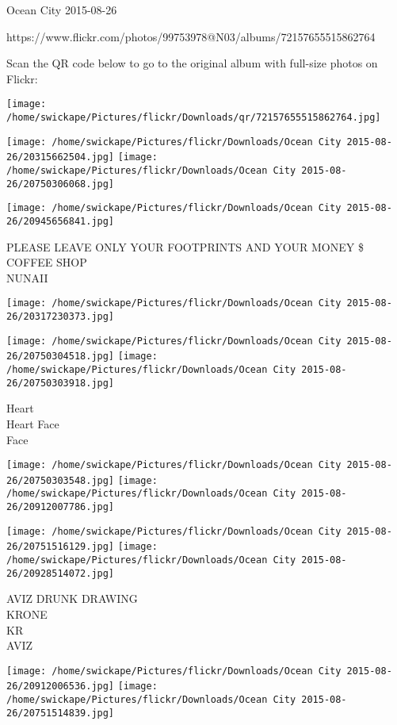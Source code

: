 \documentclass[10pt,letterpaper]{article}
\begin{document}
Ocean City 2015-08-26

https://www.flickr.com/photos/99753978@N03/albums/72157655515862764

Scan the QR code below to go to the original album with full-size photos on Flickr:

\texttt{[image: /home/swickape/Pictures/flickr/Downloads/qr/72157655515862764.jpg]}
\pagebreak

\texttt{[image: /home/swickape/Pictures/flickr/Downloads/Ocean City 2015-08-26/20315662504.jpg]}
\texttt{[image: /home/swickape/Pictures/flickr/Downloads/Ocean City 2015-08-26/20750306068.jpg]}

\texttt{[image: /home/swickape/Pictures/flickr/Downloads/Ocean City 2015-08-26/20945656841.jpg]}

PLEASE LEAVE ONLY YOUR FOOTPRINTS AND YOUR MONEY \$\\
COFFEE SHOP\\
NUNAII
\pagebreak

\texttt{[image: /home/swickape/Pictures/flickr/Downloads/Ocean City 2015-08-26/20317230373.jpg]}

\vspace{0.25in}
\texttt{[image: /home/swickape/Pictures/flickr/Downloads/Ocean City 2015-08-26/20750304518.jpg]}
\texttt{[image: /home/swickape/Pictures/flickr/Downloads/Ocean City 2015-08-26/20750303918.jpg]}

Heart\\
Heart Face\\
Face
\pagebreak

\texttt{[image: /home/swickape/Pictures/flickr/Downloads/Ocean City 2015-08-26/20750303548.jpg]}
\texttt{[image: /home/swickape/Pictures/flickr/Downloads/Ocean City 2015-08-26/20912007786.jpg]}

\texttt{[image: /home/swickape/Pictures/flickr/Downloads/Ocean City 2015-08-26/20751516129.jpg]}
\texttt{[image: /home/swickape/Pictures/flickr/Downloads/Ocean City 2015-08-26/20928514072.jpg]}

AVIZ DRUNK DRAWING\\
KRONE\\
KR\\
AVIZ
\pagebreak

\texttt{[image: /home/swickape/Pictures/flickr/Downloads/Ocean City 2015-08-26/20912006536.jpg]}
\texttt{[image: /home/swickape/Pictures/flickr/Downloads/Ocean City 2015-08-26/20751514839.jpg]}
\end{document}
